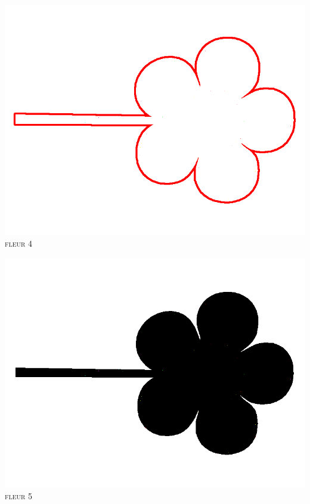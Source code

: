 \documentclass[french]{article}
\begin{document}
  \begin{center}
    \begin{minipage}{.45\textwidth}
      \begin{center}
	\includegraphics[scale=0.19]{./pictures/flower5.png}\\
	\textsc{fleur 4}
      \end{center}
    \end{minipage}
    \begin{minipage}{.45\textwidth}
      \begin{center}
	\includegraphics[scale=0.19]{./pictures/flower6.png}\\
	\textsc{fleur 5}
      \end{center}
    \end{minipage}
  \end{center}
  
\end{document}
